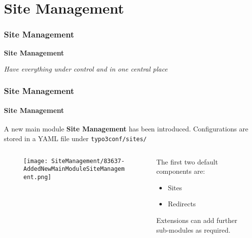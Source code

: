 %

\section{Site Management}
\begin{frame}[fragile]
	\frametitle{Site Management}

	\begin{center}\huge{\color{typo3darkgrey}\textbf{Site Management}}\end{center}
	\begin{center}\large{\textit{Have everything under control and in one central place}}\end{center}

\end{frame}


\begin{frame}[fragile]
	\frametitle{Site Management}
	\framesubtitle{Site Management}

	A new main module \textbf{Site Management} has been introduced.
	Configurations are stored in a YAML file under \texttt{typo3conf/sites/}

	\begin{columns}[T]
		\begin{column}{.4\textwidth}
			\begin{figure}\vspace*{-0.4cm}
				\texttt{[image: SiteManagement/83637-AddedNewMainModuleSiteManagement.png]}
			\end{figure}
		\end{column}
		\begin{column}{.5\textwidth}
			The first two default components are:
			\begin{itemize}
				\item Sites
				\item Redirects
			\end{itemize}
			\vspace{0.4cm}
			Extensions can add further sub-modules as required.
		\end{column}
		\begin{column}{.1\textwidth}
		\end{column}
	\end{columns}

\end{frame}

